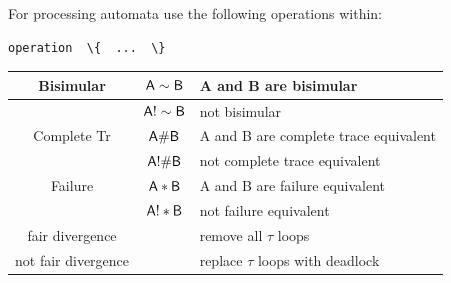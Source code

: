 \documentclass[]{article}
\newcounter{dead1}
\newcounter{dead2}
\begin{document}
\vspace{2ex} \noindent For processing automata use the following operations within:

\begin{verbatim}operation  \{  ...  \}\end{verbatim}

\vspace{2ex}
\begin{tabular}{|c|c|l|}\hline
Bisimular   & $\sf A\sim B$  & A and B are bisimular\\ \hline
    & $\sf A !\sim B$  &  not bisimular\\ \hline
Complete Tr   & $\sf A\# B$  & A and B are complete trace equivalent\\ \hline
     & $\sf A !\# B$  &  not complete trace equivalent\\ \hline 
     
Failure   & $\sf A* B$  & A and B are failure equivalent\\ \hline
       & $\sf A !* B$  &  not failure equivalent\\ \hline \hline
fair divergence  & & remove all $\tau$ loops \\ \hline
not fair divergence  & & replace $\tau$ loops  with deadlock\\ \hline
\end{tabular}







\end{document}
